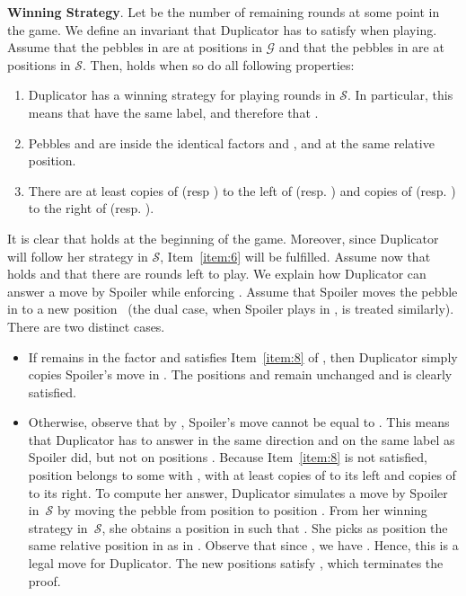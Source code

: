 \documentclass[a4paper,USenglish]{lipics}
\newcommand\Gs{\ensuremath{\mathcal{G}}\xspace}
\newcommand\Ss{\ensuremath{\mathcal{S}}\xspace}
\newcommand\highlight[1]{\par\bigskip\noindent\textbf{\sffamily #1}.}
\theoremstyle{plain}
\begin{document}
\highlight{Winning Strategy} Let  be the number of remaining rounds at
some point in the game. We define an invariant  that Duplicator has
to satisfy when playing. Assume that the pebbles in  are at positions
 in \Gs and that the pebbles in  are at positions  in
\Ss. Then,  holds when so do all following properties:
\begin{enumerate}
\item\label{item:6} Duplicator has a winning strategy for playing  rounds in
  \Ss. In particular, this means that  have the same label, and therefore
  that .
\item\label{item:7} Pebbles  and  are inside the identical factors
   and
  , and at the same relative position.
\item\label{item:8} There are at least  copies of  (resp ) to
  the left of  (resp. ) and  copies of 
  (resp. ) to the right of  (resp. ).
\end{enumerate}

It is clear that  holds at the beginning of the game. Moreover, since
Duplicator will follow her strategy in \Ss, Item~\ref{item:6} will be
fulfilled. Assume now that  holds and that there are 
rounds left to play. We explain how Duplicator can answer a move by Spoiler
while enforcing . Assume that Spoiler moves the pebble in  to a
new position~ (the dual case, when Spoiler plays in , is treated
similarly). There are two distinct cases.

\begin{itemize}
\item If  remains in the factor 
  and satisfies Item~\ref{item:8} of , then Duplicator simply copies
  Spoiler's move in . The
  positions  and  remain unchanged and  is clearly
  satisfied.

\item Otherwise, observe that by , Spoiler's move  cannot be
  equal to . This means that Duplicator has to answer in the same
  direction and on the same label as Spoiler did, but not on positions
  . Because Item~\ref{item:8} is not satisfied, position  belongs
  to some  with , with at least
   copies of  to its left and  copies of  to its
  right. To compute her answer, Duplicator simulates a move by Spoiler in~\Ss
  by moving the pebble from position  to position . From her winning
  strategy in~\Ss, she obtains a position  in  such that
  . She picks as position
   the same relative position in 
  as  in . Observe that since ,
  we have . Hence, this is a legal move for Duplicator. The new positions  satisfy ,
  which terminates the proof.
\end{itemize}
\end{document}
